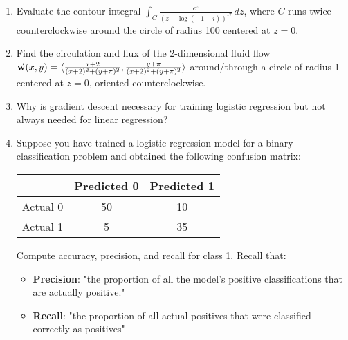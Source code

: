 \documentclass[12pt]{article}
\begin{document}
\begin{enumerate}[label=\textbf{Problem \arabic*.}, leftmargin=*]
\newpage

\item Evaluate the contour integral $\int_C \frac{e^z}{(z-\log(-1-i))^{17}} \, dz$, where $C$ runs twice counterclockwise around the circle of radius 100 centered at $z=0$.
\vspace{8cm}

\item Find the circulation and flux of the 2-dimensional fluid flow $\vec{\bf w}(x,y) = \langle \frac{x+2}{(x+2)^2+(y+\pi)^2} , \frac{y+\pi}{(x+2)^2+(y+\pi)^2} \rangle$ around/through a circle of radius 1 centered at $z=0$, oriented counterclockwise.
\vspace{8cm}

\item Why is gradient descent necessary for training logistic regression but not always needed for linear regression?
\vspace{6cm}

\item Suppose you have trained a logistic regression model for a binary classification problem and obtained the following confusion matrix:
\begin{center}
\begin{tabular}{c|c|c}
     & Predicted 0 & Predicted 1 \\
    \hline
    Actual 0 & 50 & 10 \\
    Actual 1 & 5 & 35 \\
\end{tabular}
\end{center}
Compute accuracy, precision, and recall for class 1. Recall that: 
\begin{itemize}
\item \textbf{Precision}: "the proportion of all the model's positive classifications that are actually positive." 
\item \textbf{Recall}: "the proportion of all actual positives that were classified correctly as positives"
\end{itemize}
\vspace{6cm}

\end{enumerate}
\end{document}
